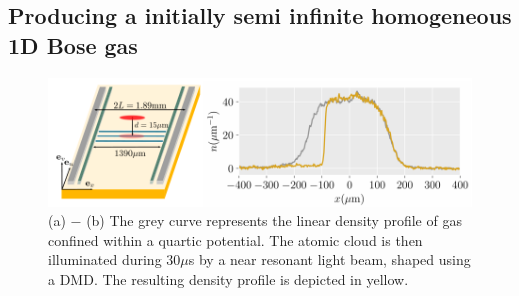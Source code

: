 \documentclass[submission, Phys]{SciPost}
\begin{document}
\subsection{Producing a initially semi infinite homogeneous 1D Bose gas}

\begin{figure}[!htb]
    \centering
    \includegraphics[width=1.0\linewidth]{Figures/Atom_chip.PNG}
    \caption{(a) $-$ (b) The grey curve represents the linear density profile of gas confined within a quartic potential. The atomic cloud is then illuminated during $30 \mu$s by a near resonant light beam, shaped using a DMD. The resulting density profile is depicted in yellow.}
    \label{fig:enter-label}
\end{figure}
\end{document}
